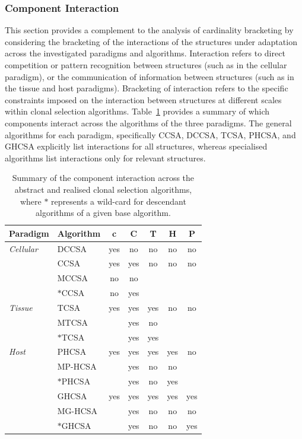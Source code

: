 %
\subsubsection{Component Interaction}
This section provides a complement to the analysis of cardinality bracketing by considering the bracketing of the interactions of the structures under adaptation across the investigated paradigms and algorithms. Interaction refers to direct competition or pattern recognition between structures (such as in the cellular paradigm), or the communication of information between structures (such as in the tissue and host paradigms). Bracketing of interaction refers to the specific constraints imposed on the interaction between structures at different scales within clonal selection algorithms. Table~\ref{tab:framework:hcsf:interaction} provides a summary of which components interact across the algorithms of the three paradigms. The general algorithms for each paradigm, specifically CCSA, DCCSA, TCSA, PHCSA, and GHCSA explicitly list interactions for all structures, whereas specialised algorithms list interactions only for relevant structures. 

\begin{table}[htp]
	\centering\small
		\begin{tabular}{llccccc}
		\toprule
		\textbf{Paradigm} & \textbf{Algorithm} & \textbf{c} & \textbf{C} & \textbf{T} & \textbf{H} & \textbf{P} \\ 
		\toprule
		\emph{Cellular} & DCCSA 			& yes & no & no & no & no \\ 										
									  & CCSA 				& yes & yes & no & no & no \\ 
									  & MCCSA 			& no & no &  &  &  \\
									  & $\ast$CCSA	& no & yes &  &  &  \\
		\midrule
		\emph{Tissue} & TCSA 				& yes & yes & yes & no & no \\ 
								  & MTCSA 			&  & yes & no &  &  \\ 
								  & $\ast$TCSA 	&  & yes & yes &  &  \\ 								  
		\midrule
		\emph{Host} & PHCSA 				& yes & yes & yes & yes & no \\ 
								& MP-HCSA 	 		&  & yes & no & no &  \\ 
								& $\ast$PHCSA 	&  & yes & no & yes &  \\ 							
								& GHCSA 				& yes & yes & yes & yes & yes \\ 
								& MG-HCSA  			&  & yes & no & no & no \\ 
								& $\ast$GHCSA 	&  & yes & no & no & yes \\ 								
		\bottomrule
		\end{tabular}
	\caption{Summary of the component interaction across the abstract and realised clonal selection algorithms, where $\ast$ represents a wild-card for descendant algorithms of a given base algorithm.}
	\label{tab:framework:hcsf:interaction}
\end{table}

